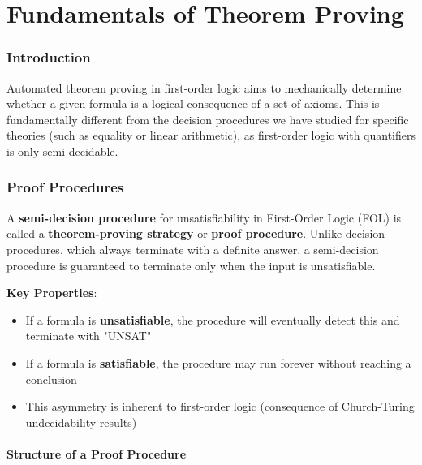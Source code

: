 \documentclass[11pt,a4paper]{article}
\theoremstyle{definition}
\theoremstyle{plain}
\theoremstyle{remark}
\begin{document}
\newpage



\part{Fundamentals of Theorem Proving}

\section{Introduction}

Automated theorem proving in first-order logic aims to mechanically determine whether a given formula is a logical consequence of a set of axioms. This is fundamentally different from the decision procedures we have studied for specific theories (such as equality or linear arithmetic), as first-order logic with quantifiers is only semi-decidable.

\section{Proof Procedures}

A \textbf{semi-decision procedure} for unsatisfiability in First-Order Logic (FOL) is called a \textbf{theorem-proving strategy} or \textbf{proof procedure}. Unlike decision procedures, which always terminate with a definite answer, a semi-decision procedure is guaranteed to terminate only when the input is unsatisfiable.

\begin{tcolorbox}[colback=yellow!5!white,colframe=yellow!75!black,title=\textbf{Semi-Decidability of First-Order Logic}]
\textbf{Key Properties}:
\begin{itemize}
    \item If a formula is \textbf{unsatisfiable}, the procedure will eventually detect this and terminate with "UNSAT"
    \item If a formula is \textbf{satisfiable}, the procedure may run forever without reaching a conclusion
    \item This asymmetry is inherent to first-order logic (consequence of Church-Turing undecidability results)
\end{itemize}
\end{tcolorbox}

\subsection{Structure of a Proof Procedure}
\end{document}
